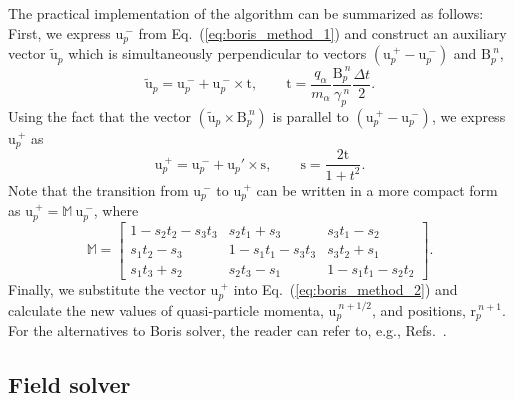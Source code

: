 \documentclass[10pt, a4paper, twoside, openright]{report}
\renewcommand{\vec}[1]{\boldsymbol{\mathrm{#1}}}
\begin{document}
The practical implementation of the algorithm can be summarized as follows: First, we express $ \vec{u}_{p}^{\:-} $ from Eq.~(\ref{eq:boris_method_1}) and construct an auxiliary vector $ \tilde{\vec{u}}_{p} $ which is simultaneously perpendicular to vectors $ \left(\vec{u}_{p}^{\:+} - \vec{u}_{p}^{\:-} \right) $ and $ \vec{B}_{p}^{\:n} $,
\begin{equation}
	\tilde{\vec{u}}_{p} = \vec{u}_{p}^{\:-} + \vec{u}_{p}^{\:-} \times \vec{t}, \qquad \vec{t} = \frac{q_{\alpha}}{m_{\alpha}} \frac{\vec{B}_p^{\:n}}{\gamma_p^{\:n}} \frac{\Delta t}{2}.
\end{equation}
Using the fact that the vector $ (\tilde{\vec{u}}_{p} \times \vec{B}_{p}^{\:n}) $ is parallel to $ \left(\vec{u}_{p}^{\:+} - \vec{u}_{p}^{\:-} \right) $, we express $ \vec{u}_{p}^{\:+} $ as
\begin{equation}
	\vec{u}_{p}^{\:+} = \vec{u}_{p}^{\:-} + \vec{u}_{p}\!' \times \vec{s}, \qquad \vec{s} = \frac{2\vec{t}}{1 + t^2}.
\end{equation}
Note that the transition from $ \vec{u}_{p}^{\:-} $ to $ \vec{u}_{p}^{\:+} $ can be written in a more compact form as $ \vec{u}_{p}^{\:+} = \mathbb{M} \: \vec{u}_{p}^{\:-} $, where
\begin{equation}
	\mathbb{M} = 
	\begin{bmatrix}
		1 - s_{2}t_{2} - s_{3}t_{3} & s_{2}t_{1} + s_{3} & s_{3}t_{1} - s_{2} \\
		s_{1}t_{2} - s_{3} & 1 - s_{1}t_{1} - s_{3}t_{3} & s_{3}t_{2} + s_{1} \\
		s_{1}t_{3} + s_{2} & s_{2}t_{3} - s_{1} & 1 - s_{1}t_{1} - s_{2}t_{2}
	\end{bmatrix}.
\end{equation}
Finally, we substitute the vector $ \vec{u}_{p}^{\:+} $ into Eq.~(\ref{eq:boris_method_2}) and calculate the new values of quasi-particle momenta, $ \vec{u}_{p}^{\:n+1/2} $, and positions, $ \vec{r}_{p}^{\:n+1} $. For the alternatives to Boris solver, the reader can refer to, e.g., Refs.~.

\subsection{Field solver}
\end{document}
